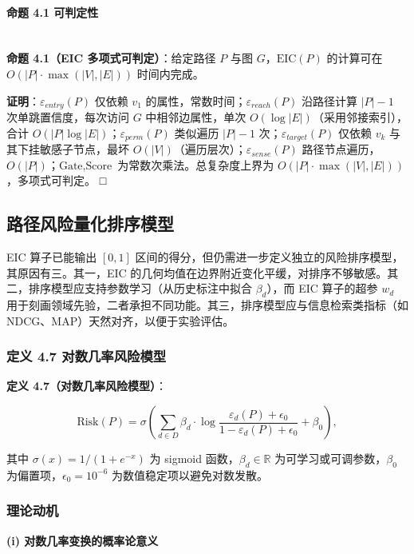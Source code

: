 \documentclass[a4paper,12pt]{ctexart}
\begin{document}
\paragraph{命题 4.1 可判定性}\mbox{}\\

\textbf{命题 4.1（EIC 多项式可判定）}：给定路径 $P$ 与图 $G$，$\text{EIC}(P)$ 的计算可在 $O(|P| \cdot \max(|V|, |E|))$ 时间内完成。

\textbf{证明}：$\varepsilon_{entry}(P)$ 仅依赖 $v_1$ 的属性，常数时间；$\varepsilon_{reach}(P)$ 沿路径计算 $|P|-1$ 次单跳置信度，每次访问 $G$ 中相邻边属性，单次 $O(\log |E|)$（采用邻接索引），合计 $O(|P| \log |E|)$；$\varepsilon_{perm}(P)$ 类似遍历 $|P|-1$ 次；$\varepsilon_{target}(P)$ 仅依赖 $v_k$ 与其下挂敏感子节点，最坏 $O(|V|)$（遍历层次）；$\varepsilon_{sense}(P)$ 路径节点遍历，$O(|P|)$；$\text{Gate}, \text{Score}$ 为常数次乘法。总复杂度上界为 $O(|P| \cdot \max(|V|, |E|))$，多项式可判定。 □

\subsection{路径风险量化排序模型}

EIC 算子已能输出 $[0,1]$ 区间的得分，但仍需进一步定义独立的风险排序模型，其原因有三。其一，EIC 的几何均值在边界附近变化平缓，对排序不够敏感。其二，排序模型应支持参数学习（从历史标注中拟合 $\beta_d$），而 EIC 算子的超参 $w_d$ 用于刻画领域先验，二者承担不同功能。其三，排序模型应与信息检索类指标（如 NDCG、MAP）天然对齐，以便于实验评估。

\subsubsection{定义 4.7 对数几率风险模型}

\textbf{定义 4.7（对数几率风险模型）}：

\[
\text{Risk}(P) = \sigma\!\left( \sum_{d \in D} \beta_d \cdot \log\frac{\varepsilon_d(P) + \epsilon_0}{1 - \varepsilon_d(P) + \epsilon_0} + \beta_0 \right),
\]

其中 $\sigma(x) = 1/(1 + e^{-x})$ 为 sigmoid 函数，$\beta_d \in \mathbb{R}$ 为可学习或可调参数，$\beta_0$ 为偏置项，$\epsilon_0 = 10^{-6}$ 为数值稳定项以避免对数发散。

\subsubsection{理论动机}

\textbf{(i) 对数几率变换的概率论意义}
\end{document}

